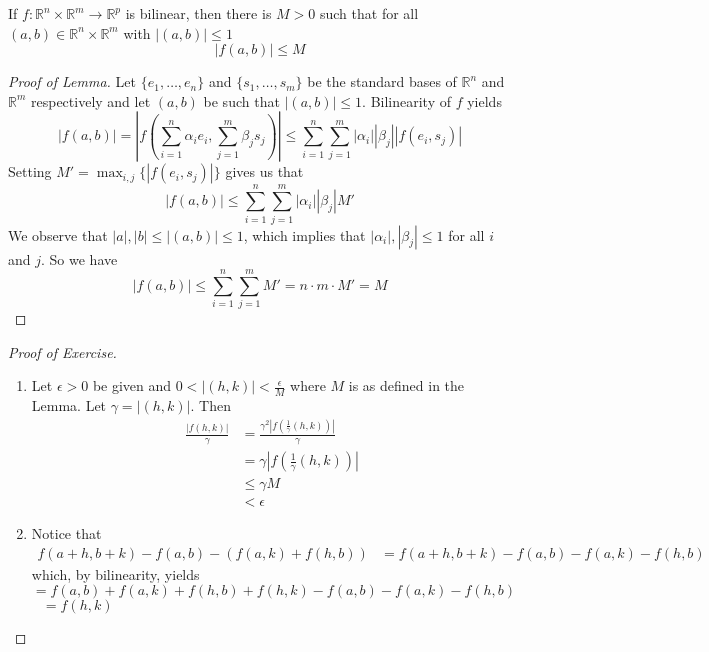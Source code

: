 \begin{enumerate}
    \begin{lemma}
    If \( f: \mathbb{R}^n \times \mathbb{R}^m \rightarrow \mathbb{R}^p \) is bilinear, then there is \( M > 0 \) such that for all \( (a,b) \in \mathbb{R}^n \times \mathbb{R}^m \) with \( \left| (a,b) \right| \leq 1 \)
    \[
    \left| f(a,b) \right| \leq M 
    \]
    \end{lemma}
    \begin{proof}[Proof of Lemma]Let \( \{ e_1,\ldots,e_n \} \) and \( \{ s_1,\ldots,s_m \} \) be the standard bases of \( \mathbb{R}^n \) and \( \mathbb{R}^m \) respectively and let \( (a,b) \) be such that \( \left| (a,b) \right| \leq 1 \). Bilinearity of \( f \) yields 
    \[
    \left| f(a,b) \right| = \left| f\left( \sum_{i=1}^n \alpha_i e_i, \sum_{j=1}^m \beta_j s_j\right) \right| \leq \sum_{i=1}^n\sum_{j=1}^m \left| \alpha_i \right| \left| \beta_j \right| \left| f(e_i,s_j) \right|
    \]
    Setting \( M' = \max_{i,j}\{ \left| f(e_i,s_j) \right| \} \) gives us that
    \[
    \left| f(a,b) \right| \leq \sum_{i=1}^n\sum_{j=1}^m \left| \alpha_i \right| \left| \beta_j \right| M' 
    \]
    We observe that \( \left| a \right|, \left| b \right| \leq \left| (a,b) \right| \leq 1 \), which implies that \( \left| \alpha_i \right|, \left| \beta_j \right| \leq 1 \) for all \( i \) and \( j \). So we have
    \[
    \left| f(a,b) \right| \leq \sum_{i=1}^n\sum_{j=1}^m M' = n\cdot m \cdot M' = M
    \]
    \end{proof}
    \begin{proof}[Proof of Exercise]
    \begin{enumerate}
        \item Let \( \epsilon > 0 \) be given and \( 0 < \left| (h,k) \right| < \frac{\epsilon}{M} \) where \( M \) is as defined in the Lemma. Let \( \gamma = \left| (h,k) \right| \). Then
        \begin{align*}
            \frac{\left| f(h,k) \right|}{\gamma} &= \frac{\gamma^2 \left| f\left( \frac{1}{\gamma} (h,k) \right) \right|}{\gamma} \\
            &= \gamma \left| f\left( \frac{1}{\gamma} (h,k) \right) \right| \\
            &\leq \gamma M \\
            &< \epsilon
        \end{align*}
        
        \item Notice that
        \begin{align*}
            f(a+h,b+k) - f(a,b) - (f(a,k) + f(h,b)) &= f(a+h,b+k) - f(a,b) - f(a,k) - f(h,b)
        \end{align*}
        which, by bilinearity, yields
        \[
        = f(a,b) + f(a,k) + f(h,b) + f(h,k) - f(a,b) - f(a,k) - f(h,b) 
        \]
        \(\;\:\: = f(h,k) \)
        

\end{enumerate}
\end{proof}
\end{enumerate}
